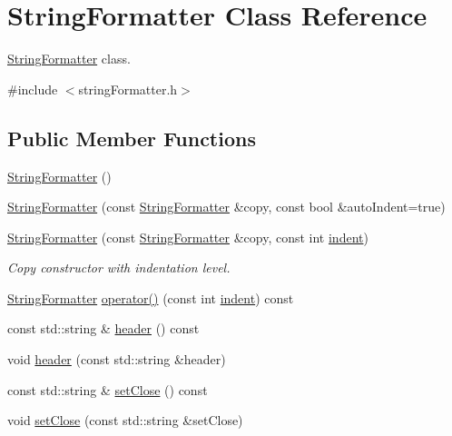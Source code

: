\hypertarget{classStringFormatter}{}\section{String\+Formatter Class Reference}
\label{classStringFormatter}


\hyperlink{classStringFormatter}{String\+Formatter} class.  




{\ttfamily \#include $<$string\+Formatter.\+h$>$}

\subsection*{Public Member Functions}
\begin{DoxyCompactItemize}
\item 
\hyperlink{classStringFormatter_a44a72490b89aaddafecedfb48e1613ff}{String\+Formatter} ()
\item 
\hyperlink{classStringFormatter_a5ad14c57a78febf7f120fb867cb25680}{String\+Formatter} (const \hyperlink{classStringFormatter}{String\+Formatter} \&copy, const bool \&auto\+Indent=true)
\item 
\hyperlink{classStringFormatter_ae74e7245e1e8564eb3b4f98dc6ed228f}{String\+Formatter} (const \hyperlink{classStringFormatter}{String\+Formatter} \&copy, const int \hyperlink{classStringFormatter_adeedf1dce9545fb00bc070e4caaf30aa}{indent})
\begin{DoxyCompactList}\small\item\em Copy constructor with indentation level. \end{DoxyCompactList}\item 
\hyperlink{classStringFormatter}{String\+Formatter} \hyperlink{classStringFormatter_aa60790b08f6f3c4a1cbf5e3dec0a8895}{operator()} (const int \hyperlink{classStringFormatter_adeedf1dce9545fb00bc070e4caaf30aa}{indent}) const
\item 
const std\+::string \& \hyperlink{classStringFormatter_ab4fb73dc094c5ee247606a64194136c5}{header} () const
\item 
void \hyperlink{classStringFormatter_a03df224c2ed00ef8b01d6e8f4b65136b}{header} (const std\+::string \&header)
\item 
const std\+::string \& \hyperlink{classStringFormatter_acfc112049e763b2ced09e1f30c151244}{set\+Close} () const
\item 
void \hyperlink{classStringFormatter_a25e503d8ea3bf513abfe1bbe36f0953e}{set\+Close} (const std\+::string \&set\+Close)

\end{DoxyCompactItemize}
